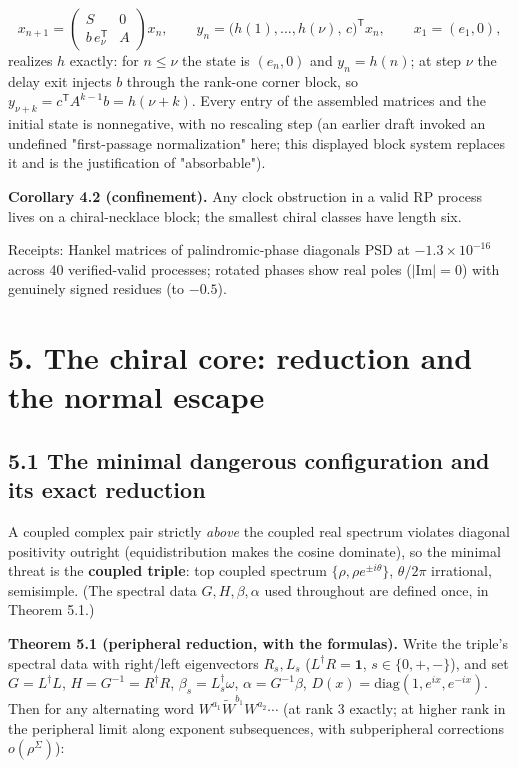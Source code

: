 \documentclass[11pt]{article}
\begin{document}
\[
x_{n+1} = \begin{pmatrix} S & 0 \\ b\,e_\nu^{\mathsf T} & A
\end{pmatrix} x_n, \qquad
y_n = \bigl(h(1), \ldots, h(\nu),\, c\bigr)^{\mathsf T} x_n,
\qquad x_1 = (e_1, 0),
\]
realizes $h$ exactly: for $n \le \nu$ the state is $(e_n, 0)$ and $y_n = h(n)$; at step $\nu$ the delay exit injects $b$ through the rank-one corner block, so $y_{\nu+k} = c^{\mathsf T} A^{k-1} b = h(\nu + k)$.  Every entry of the assembled matrices and the initial state is nonnegative, with no rescaling step (an earlier draft invoked an undefined "first-passage normalization" here; this displayed block system replaces it and is the justification of "absorbable").

\textbf{Corollary 4.2 (confinement).}  Any clock obstruction in a valid RP process lives on a chiral-necklace block; the smallest chiral classes have length six.

Receipts: Hankel matrices of palindromic-phase diagonals PSD at $-1.3\times 10^{-16}$ across 40 verified-valid processes; rotated phases show real poles ($|\mathrm{Im}| = 0$) with genuinely signed residues (to $-0.5$).

\section*{5. The chiral core: reduction and the normal escape}
\subsection*{5.1 The minimal dangerous configuration and its exact reduction}
A coupled complex pair strictly \emph{above} the coupled real spectrum violates diagonal positivity outright (equidistribution makes the cosine dominate), so the minimal threat is the \textbf{coupled triple}: top coupled spectrum $\{\rho, \rho e^{\pm i\theta}\}$, $\theta/2\pi$ irrational, semisimple.  (The spectral data $G, H, \beta, \alpha$ used throughout are defined once, in Theorem 5.1.)

\textbf{Theorem 5.1 (peripheral reduction, with the formulas).}  Write the triple's spectral data with right/left eigenvectors $R_s, L_s$ ($L^\dagger R = \mathbf 1$, $s \in \{0, +, -\}$), and set $G = L^\dagger L$, $H = G^{-1} = R^\dagger R$, $\beta_s = L_s^\dagger\omega$, $\alpha = G^{-1}\beta$, $D(x) = \mathrm{diag}(1, e^{ix}, e^{-ix})$.  Then for any alternating word $W^{a_1}\widetilde W^{b_1}W^{a_2}\cdots$ (at rank 3 exactly; at higher rank in the peripheral limit along exponent subsequences, with subperipheral corrections $o(\rho^{\Sigma})$):
\end{document}
